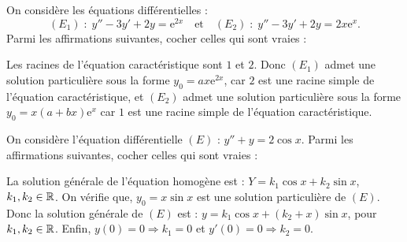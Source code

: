 \begin{question}
On considère les équations différentielles :
$$(E_1)\; :\; y''-3y'+2y=\mathrm{e}^{2x}\quad \mbox{et}\quad (E_2)\; :\; y''-3y'+2y=2x\mathrm{e}^{x}.$$
Parmi les affirmations suivantes, cocher celles qui sont vraies :
\begin{answers}  
\end{answers}
\begin{explanations}
Les racines de l'équation caractéristique sont $1$ et $2$. Donc $(E_1)$ admet une solution particulière sous la forme $\displaystyle y_0=ax\mathrm{e}^{2x}$, car $2$ est une racine simple de l'équation caractéristique, et $(E_2)$ admet une solution particulière sous la forme $\displaystyle y_0=x(a+bx)\mathrm{e}^{x}$ car $1$ est une racine simple de l'équation caractéristique.
\end{explanations}
\end{question}

\begin{question}
On considère l'équation différentielle $(E)$ : $y''+y=2\cos x$. Parmi les affirmations suivantes, cocher celles qui sont vraies :
\begin{answers}  
\end{answers}
\begin{explanations}
La solution générale  de l'équation homogène est : $Y=k_1\cos x+k_2\sin x$, $k_1,k_2\in \mathbb{R}$. On vérifie que, $\displaystyle y_0=x\sin x $ est une solution particulière de $(E)$. Donc la solution générale de $(E)$ est : $\displaystyle y=k_1\cos x+(k_2+x)\sin x$, pour $k_1,k_2\in \mathbb{R}$. Enfin, $y(0)=0\Rightarrow k_1=0$ et $y'(0)=0\Rightarrow k_2=0$.
\end{explanations}
\end{question}

